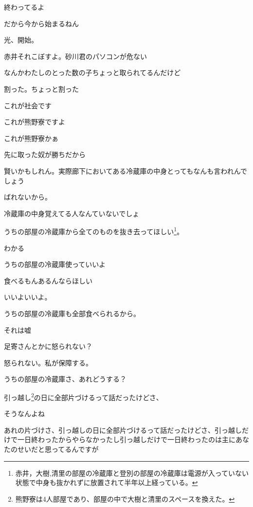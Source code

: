 \begin{multicols}{3}
終わってるよ

だから今から始まるねん

光、開始。

赤井それこぼすよ。砂川君のパソコンが危ない

なんかわたしのとった数の子ちょっと取られてるんだけど

割った。ちょっと割った

これが社会です

これが熊野寮ですよ

これが熊野寮かぁ

先に取った奴が勝ちだから

\vspace{5mm}


\noindent{}

賢いかもしれん。実際廊下においてある冷蔵庫の中身とってもなんも言われんでしょう

ばれないから。

冷蔵庫の中身覚えてる人なんていないでしょ

うちの部屋の冷蔵庫から全てのものを抜き去ってほしい\footnote{赤井，大樹,清里の部屋の冷蔵庫と登別の部屋の冷蔵庫は電源が入っていない状態で中身も抜かれずに放置されて半年以上経っている。}。

わかる

うちの部屋の冷蔵庫使っていいよ

食べるもんあるんならほしい

いいよいいよ。

うちの部屋の冷蔵庫も全部食べられるから。

それは嘘

足寄さんとかに怒られない？

怒られない。私が保障する。

うちの部屋の冷蔵庫さ、あれどうする？

引っ越し\footnote{熊野寮は4人部屋であり、部屋の中で大樹と清里のスペースを換えた。}の日に全部片づけるって話だったけどさ、

そうなんよね

あれの片づけさ、引っ越しの日に全部片づけるって話だったけどさ、引っ越しだけで一日終わったからやらなかったし引っ越しだけで一日終わったのは主にあなたのせいだと思ってるんですが


\end{multicols}

